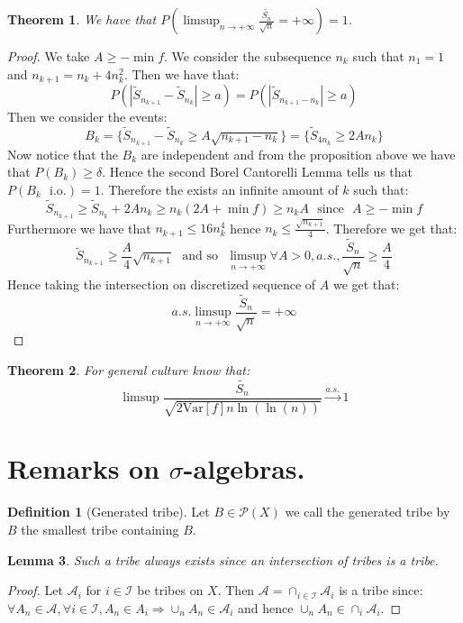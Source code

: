 \documentclass[10pt,a4paper]{book}
\newtheorem{theorem}{Theorem}[section]
\newtheorem{lemma}[theorem]{Lemma}
\theoremstyle{definition}
\newtheorem{definition}{Definition}[section]
\begin{document}
\begin{theorem}
We have that $P(\limsup_{n \to +\infty} \frac{\tilde{S_n}}{\sqrt{n}} = +\infty) = 1$. 
\end{theorem}

\begin{proof}
We take $A \geq - \min f$. We consider the subsequence $n_k$ such that $n_1 = 1$ and $n_{k+1} = n_k + 4 n_k^2$. Then we have that:
\[
P(|\tilde{S}_{n_{k+1}} - \tilde{S}_{n_k}| \geq a) = P(|\tilde{S}_{n_{k+1} - n_k}| \geq a)
\] 
Then we consider the events:
\[
B_k = \{ \tilde{S}_{n_{k + 1}} - \tilde{S}_{n_k} \geq A \sqrt{n_{k+1} - n_k} \} = \{ \tilde{S}_{4 n_k} \geq 2 A n_k \}
\]
Now notice that the $B_k$ are independent and from the proposition above we have that $P(B_k) \geq \delta$. Hence the second Borel Cantorelli Lemma tells us that $P(B_k \mbox{~~i.o.}) = 1$. Therefore the exists an infinite amount of $k$ such that:
\[
\tilde{S}_{n_{k+1}} \geq \tilde{S}_{n_k} + 2 A n_k \geq n_k (2 A + \min f) \geq n_k A \mbox{~~since~~} A \geq - \min f
\]
Furthermore we have that $n_{k + 1} \leq 16 n_k^4$ hence $n_k \leq \frac{\sqrt{n_{k+1}}}{4}$. Therefore we get that:
\[
\tilde{S}_{n_{k+1}} \geq \frac{A}{4} \sqrt{n_{k+1}} \mbox{~~and so~~} \limsup_{n \to +\infty} \forall A > 0, a.s., \frac{\tilde{S}_n}{\sqrt{n}} \geq \frac{A}{4}
\]
Hence taking the intersection on discretized sequence of $A$ we get that:
\[
a.s. \limsup_{n \to +\infty} \frac{\tilde{S}_n}{\sqrt{n}} = +\infty
\]
\end{proof}

\begin{theorem}
For general culture know that:
\[
\limsup \frac{\tilde{S_n}}{\sqrt{2 \text{Var}[f] n \ln(\ln(n))}} \stackrel{a.s.}{\longrightarrow} 1 
\]
\end{theorem}

\section{Remarks on $\sigma$-algebras.}

\begin{definition}[Generated tribe] Let $B \in \mathcal{P}(X)$ we call the generated tribe by $B$ the smallest tribe containing $B$. 
\end{definition}

\begin{lemma}
Such a tribe always exists since an intersection of tribes is a tribe.
\end{lemma}

\begin{proof}
Let $\mathcal{A}_i$ for $i \in \mathcal{I}$ be tribes on $X$. Then $\mathcal{A} = \cap_{i \in \mathcal{I}} \mathcal{A}_i$ is a tribe since: $\forall A_n \in \mathcal{A}, \forall i \in \mathcal{I}, A_n \in A_i \Rightarrow \cup_n A_n \in \mathcal{A}_i$ and hence $\cup_n A_n \in \cap_i \mathcal{A}_i$. 
\end{proof}
\end{document}
